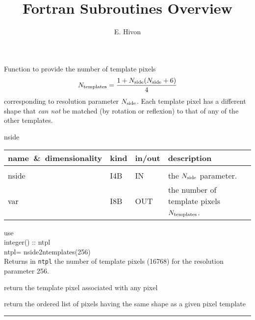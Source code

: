 
\sloppy


\title{\healpix Fortran Subroutines Overview}
 \section[nside2ntemplates]{ }
\label{sub:nside2ntemplates}
\author{E. Hivon}

\begin{facility}
{Function to provide the number of template pixels $${N_{\rm templates}}=\frac{1+{N_{\rm side}}({N_{\rm side}}+6)}{4}$$ corresponding
to resolution parameter ${N_{\rm side}}$. Each template pixel has a different shape that
{\em can not} be matched (by rotation or reflexion) to that of any of the other templates.
}
{\modPixTools}
\end{facility}

\begin{f90function}
{nside}
\end{f90function}

\begin{arguments}
{
\begin{tabular}{p{0.3\hsize} p{0.05\hsize} p{0.1\hsize} p{0.45\hsize}} \hline  
\textbf{name~\&~dimensionality} & \textbf{kind} & \textbf{in/out} & \textbf{description} \\ \hline
                   &   &   &                           \\ %
nside & I4B & IN & the ${N_{\rm side}}$ parameter. \\
var & I8B & OUT & the number of template pixels ${N_{\rm templates}}$.\\
\end{tabular}
}
\end{arguments}

\begin{example}
{
use  \\
integer() :: ntpl \\
ntpl= nside2ntemplates(256)  \\
}
{
Returns in {\tt ntpl} the number of \healpix template pixels (16768) for the resolution
parameter 256.
}
\end{example}
\begin{related}
  \begin{sulist}{} %
  \item[\htmlref{template\_pixel\_ring}{sub:template_pixel_xxx}]
  \item[\htmlref{template\_pixel\_nest}{sub:template_pixel_xxx}] return the
  template pixel associated with any \healpix pixel
  \item[\htmlref{same\_shape\_pixels\_ring}{sub:same_shape_pixels_xxx}] 
  \item[\htmlref{same\_shape\_pixels\_nest}{sub:same_shape_pixels_xxx}] 
  return
  the ordered list of pixels having the same shape as a given pixel template
  \end{sulist}
\end{related}

\rule{\hsize}{2mm}


